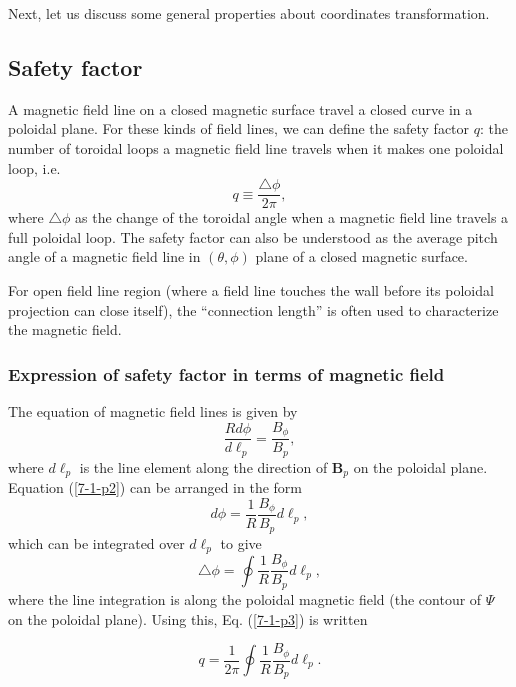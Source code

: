 \documentclass{llncs}
\begin{document}
Next, let us discuss some general properties about coordinates transformation.

\subsection{Safety factor}

A magnetic field line on a closed magnetic surface travel a closed curve in a
poloidal plane. For these kinds of field lines, we can define the safety
factor $q$: the number of toroidal loops a magnetic field line travels when it
makes one poloidal loop, i.e.
\begin{equation}
  \label{7-1-p3} q \equiv \frac{\triangle \phi}{2 \pi},
\end{equation}
where $\triangle \phi$ as the change of the toroidal angle when a magnetic
field line travels a full poloidal loop. The safety factor can also be
understood as the average pitch angle of a magnetic field line in $(\theta,
\phi)$ plane of a closed magnetic surface.

For open field line region (where a field line touches the wall before its
poloidal projection can close itself), the ``connection length'' is often used
to characterize the magnetic field.

\subsubsection{Expression of safety factor in terms of magnetic field}

The equation of magnetic field lines is given by
\begin{equation}
  \label{7-1-p2} \frac{R d \phi}{d \ell_p} = \frac{B_{\phi}}{B_p},
\end{equation}
where $d \ell_p$ is the line element along the direction of $\mathbf{B}_p$ on
the poloidal plane. Equation (\ref{7-1-p2}) can be arranged in the form
\begin{equation}
  d \phi = \frac{1}{R} \frac{B_{\phi}}{B_p} d \ell_p,
\end{equation}
which can be integrated over $d \ell_p$ to give
\begin{equation}
  \triangle \phi = \oint \frac{1}{R}  \frac{B_{\phi}}{B_p} d \ell_p,
\end{equation}
where the line integration is along the poloidal magnetic field (the contour
of $\Psi$ on the poloidal plane). Using this, Eq. (\ref{7-1-p3}) is written


\begin{equation}
  \label{9-5-e1} q = \frac{1}{2 \pi} \oint \frac{1}{R}  \frac{B_{\phi}}{B_p} d
  \ell_p .
\end{equation}
\end{document}
